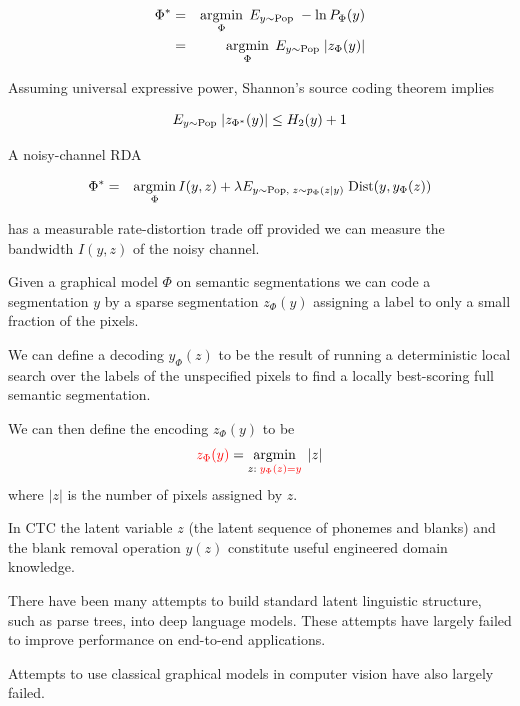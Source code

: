 {

{\color{red}
\begin{eqnarray*}
\Phi^* & = & \operatorname*{argmin}_\Phi \;E_{y \sim \mathrm{Pop}} \;-\ln P_\Phi(y) \\
& = & \operatorname*{argmin}_\Phi \;E_{y \sim \mathrm{Pop}} \;|z_\Phi(y)|
\end{eqnarray*}
}

\vfill
Assuming universal expressive power, Shannon's source coding theorem implies

{\color{red} $$E_{y \sim \mathrm{Pop}}\; |z_{\Phi^*}(y)| \leq H_2(y) +1$$}


A noisy-channel RDA

{\color{red}
\begin{eqnarray*}
\Phi^* & = & \operatorname*{argmin}_\Phi I(y,z) + \lambda E_{y \sim \mathrm{Pop},\;z\sim p_\Phi(z|y)}\; \mathrm{Dist}(y,y_\Phi(z))
\end{eqnarray*}
}

has a measurable rate-distortion trade off provided we can measure the bandwidth {\color{red} $I(y,z)$} of the noisy channel.


Given a graphical model $\Phi$ on semantic segmentations we can code a segmentation $y$
by a sparse segmentation {\color{red} $z_\Phi(y)$} assigning a label to only a small fraction of the pixels.

\vfill
We can define a decoding {\color{red} $y_\Phi(z)$} to be the result of running a deterministic local search over
the labels of the unspecified pixels to find a locally best-scoring full semantic segmentation.

\vfill
We can then define the encoding {\color{red} $z_\Phi(y)$} to be
$${\color{red} z_\Phi(y)} = \operatorname*{argmin}_{z:\; {\color{red} y_\Phi(z) = y}}\;|z|$$
where $|z|$ is the number of pixels assigned by $z$.


In CTC the latent variable $z$ (the latent sequence of phonemes and blanks) and the blank removal operation $y(z)$ constitute useful engineered domain knowledge.

\vfill
There have been many attempts to build standard latent linguistic structure, such as parse trees, into deep language models.  These attempts have
largely failed to improve performance on end-to-end applications.

\vfill
Attempts to use classical graphical models in computer vision have also largely failed.

}
